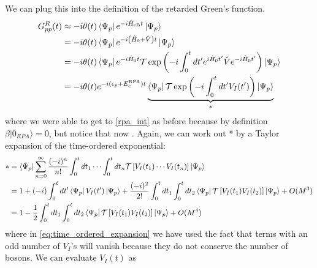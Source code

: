 We can plug this into the definition of the retarded Green's function.
\begin{align}
G_{pp}^{R}(t) &\approx -i \theta(t) \bra{\Psi_p} e^{-i\hat{H}_{\text{eB}} t} \ket{\Psi_p} \\
&= -i \theta(t) \bra{\Psi_p} e^{-i\left( \hat{H}_0 + \hat{V} \right) t} \ket{\Psi_p} \\
&= -i \theta(t) \bra{\Psi_p} e^{-i\hat{H}_0 t} \mathcal{T} \exp \left( -i \int_0^t dt' e^{i\hat{H}_0 t'} \hat{V} e^{-i\hat{H}_0 t'} \right) \ket{\Psi_p} \\
&= -i \theta(t) e^{-i (\epsilon_p + E_c^{\text{RPA}}) t} \underbrace{\bra{\Psi_p}  \mathcal{T} \exp \left( -i \int_0^t dt' V_I(t') \right) \ket{\Psi_p}}_{*} \label{rpa_int}
\end{align}
where we were able to get to \ref{rpa_int} as before because by definition $\beta|0_{RPA}\rangle = 0$, but notice that now 
. Again, we can work out * by a Taylor expansion of the time-ordered exponential:
\begin{align}
* &= \bra{\Psi_p} \sum_{n=0}^\infty \frac{(-i)^n}{n!} \int_0^t dt_1 \cdots \int_0^t dt_n \mathcal{T} \left[ V_I(t_1) \cdots V_I(t_n) \right] \ket{\Psi_p} \\
&= 1 + (-i) \int_0^t dt' \bra{\Psi_p} V_I(t') \ket{\Psi_p} + \frac{(-i)^2}{2!} \int_0^t dt_1 \int_0^t dt_2 \bra{\Psi_p} \mathcal{T} \left[ V_I(t_1) V_I(t_2) \right] \ket{\Psi_p} + O(M^3) \\
&= 1 - \frac{1}{2} \int_0^t dt_1 \int_0^t dt_2 \bra{\Psi_p} \mathcal{T} \left[ V_I(t_1) V_I(t_2) \right] \ket{\Psi_p} + O(M^4) \label{eq:time_ordered_expansion}
\end{align}
where in \ref{eq:time_ordered_expansion} we have used the fact that terms with an odd number of $V_I$'s will vanish because they do not conserve the number of bosons. We can evaluate $V_I(t)$ as
